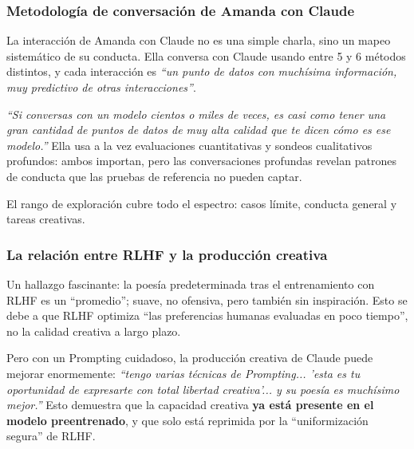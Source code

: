 \subsubsection{Metodología de conversación de Amanda con Claude}

La interacción de Amanda con Claude no es una simple charla, sino un mapeo sistemático de su conducta. Ella conversa con Claude usando entre 5 y 6 métodos distintos, y cada interacción es \textit{``un punto de datos con muchísima información, muy predictivo de otras interacciones''}.

\textit{``Si conversas con un modelo cientos o miles de veces, es casi como tener una gran cantidad de puntos de datos de muy alta calidad que te dicen cómo es ese modelo.''} Ella usa a la vez evaluaciones cuantitativas y sondeos cualitativos profundos: ambos importan, pero las conversaciones profundas revelan patrones de conducta que las pruebas de referencia no pueden captar.

El rango de exploración cubre todo el espectro: casos límite, conducta general y tareas creativas.

\subsubsection{La relación entre RLHF y la producción creativa}

Un hallazgo fascinante: la poesía predeterminada tras el entrenamiento con RLHF es un ``promedio''; suave, no ofensiva, pero también sin inspiración. Esto se debe a que RLHF optimiza ``las preferencias humanas evaluadas en poco tiempo'', no la calidad creativa a largo plazo.

Pero con un Prompting cuidadoso, la producción creativa de Claude puede mejorar enormemente: \textit{``tengo varias técnicas de Prompting... 'esta es tu oportunidad de expresarte con total libertad creativa'... y su poesía es muchísimo mejor.''} Esto demuestra que la capacidad creativa \textbf{ya está presente en el modelo preentrenado}, y que solo está reprimida por la ``uniformización segura'' de RLHF.

